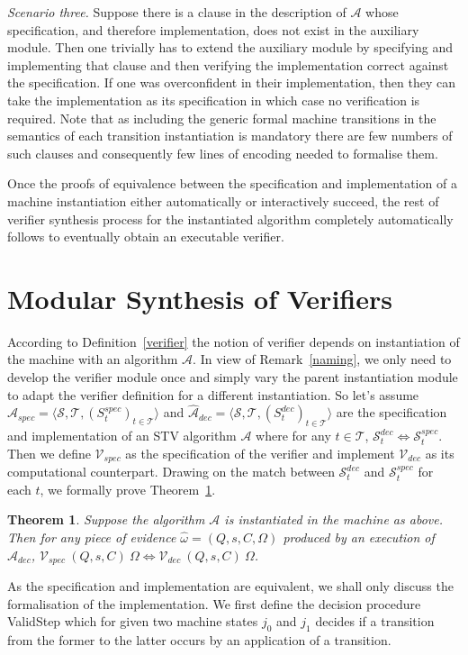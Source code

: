 \documentclass[10pt,conference]{IEEEtran}
\newtheorem{theorem}{Theorem}
\begin{document}
\emph{Scenario three.} 
 Suppose there is a clause in the description of $\mathcal{A}$ whose specification, and therefore implementation,  does not exist in the auxiliary module. Then one trivially has to extend the auxiliary module by specifying and implementing that clause and then verifying the implementation correct against the specification.  If one was overconfident in their implementation, then they can take the implementation as its specification in which case no verification is required.  Note that as including the generic formal machine transitions in the semantics of each transition instantiation is mandatory  
 there are few numbers of such clauses and consequently few lines of encoding needed to formalise them. 
 
 Once the proofs of equivalence between the specification and implementation of a machine instantiation either automatically or interactively succeed, the rest of verifier synthesis process for the instantiated algorithm completely automatically follows to eventually obtain an executable verifier. 
\section{Modular Synthesis of Verifiers}\label{sec:Syn}

According to Definition~\ref{verifier} the notion of verifier depends on instantiation of the machine with an algorithm $\mathcal{A}$. In view of Remark~\ref{naming}, we only need to develop the verifier module once and simply vary the parent instantiation module to adapt the verifier definition for a different instantiation. So let's assume $\hat{\mathcal{A}}_{spec}=\langle \mathcal{S}, \mathcal{T}, (S_{t}^{spec})_{t \in \mathcal{T}} \rangle$ and $\hat{\mathcal{A}}_{dec}= \langle \mathcal{S}, \mathcal{T}, (S_{t}^{dec})_{t \in \mathcal{T}} \rangle$ are the specification and implementation of an STV algorithm $\mathcal{A}$ where for any $t\in\mathcal{T}$, $\mathcal{S}_{t}^{dec}\Leftrightarrow\mathcal{S}_{t}^{spec}$. 
 Then we define $\mathcal{V}_{spec}$ as the specification of the verifier  and implement $\mathcal{V}_{dec}$ as its  computational counterpart. Drawing on 
 the match between $\mathcal{S}_{t}^{dec}$ and $\mathcal{S}_{t}^{spec}$ for each $t$, we formally prove Theorem~\ref{EqVerifier}.
\begin{theorem}\label{EqVerifier} 
 Suppose the algorithm $\mathcal{A}$ is instantiated in the machine as above. Then for any piece of evidence $\hat{\omega}= (Q,s,C,\Omega)$ produced by an execution of $\mathcal{A}_{dec}$, $\mathcal{V}_{spec}~(Q,s,C)~ \Omega\Leftrightarrow\mathcal{V}_{dec}~(Q,s,C)~\Omega$.    
\end{theorem}
As the specification and implementation are equivalent, we shall only discuss the formalisation of the implementation. We first define the decision procedure Valid\textunderscore{}Step which for given two machine states $j_{0}$ and $j_{1}$ decides if a transition from the former to the latter occurs by an application of a transition.
\end{document}
